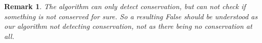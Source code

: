 \documentclass[manuscript]{acmart}
\newcommand{\1}{{\chi}}
\numberwithin{equation}{section}
\theoremstyle{thmlemcorr}
\numberwithin{theorem}{section}
\theoremstyle{thmlemcorr*}
\theoremstyle{defi}
\theoremstyle{remexample}
\newtheorem{remark}[theorem]{Remark}
\theoremstyle{ass}
\begin{document}
\begin{remark}\label{remark}
	The algorithm can only detect conservation, but can not check if something is not conserved for sure. So a resulting {\sc False} should be understood as our algorithm not detecting conservation, not as there being no conservation at all.
\end{remark}
\end{document}

